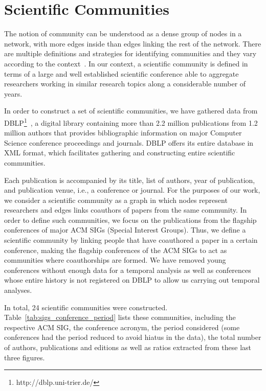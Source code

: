 \section{Scientific Communities}


The notion of community can be understood as a dense group of nodes in a network, with more edges inside than edges linking the rest of the network.  There are multiple definitions
and strategies for identifying communities and they vary according to the context~\cite{Kleinberg@cacm2008,Leskovec@www2010}. In our context, a scientific community is defined in terms of a large and well established
scientific conference able to aggregate researchers working in similar research topics along a considerable number of years. 


In order to construct a set of scientific communities, we have gathered data from DBLP\footnote{http://dblp.uni-trier.de/}~\cite{Ley:2009}, a digital library containing more
than 2.2 million publications from 1.2 million authors that provides bibliographic information on major Computer Science conference proceedings and journals.  DBLP offers its
entire database in XML format, which facilitates gathering and constructing entire scientific communities. 

Each publication is accompanied by its title, list of authors, year of publication, and publication venue, i.e., a conference or journal. For the purposes of our work, we
consider a scientific community as a graph in which nodes represent researchers and edges links coauthors of papers from the same community.  In order to define such communities,
we focus on the publications from the flagship conferences of major ACM SIGs (Special Interest Groups).  Thus, we define a scientific community by linking people that have
coauthored a paper in a certain conference, making the flagship conferences of the ACM SIGs to act as communities where coauthorships are formed. We have removed young conferences
without enough data for a temporal analysis as well as conferences whose entire history is not registered on DBLP to allow us carrying out temporal analyses. 

In total, 24 scientific communities were constructed. Table~\ref{tab:sigs_conference_period} lists these communities, including the respective ACM SIG, the conference acronym, the period
considered (some conferences had the period reduced to avoid hiatus in the data), the total number of authors, publications and editions as well as ratios extracted from these last three figures.

